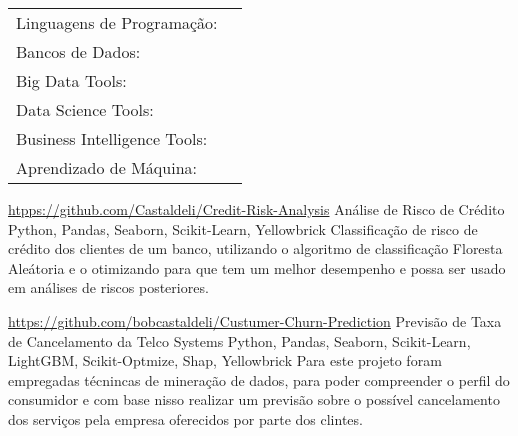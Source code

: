 \documentclass[11pt, letter]{awesome-cv}
\begin{document}
\begin{cventries}
	\vspace{-2mm}
	\cventry
	{}
	{\def\arraystretch{1.15}{\begin{tabular}{ l l }
				Linguagens de Programação:  & {\skill{ Python, R, SQL}} \\
				Bancos de Dados:  & {\skill{ MySQL, SQLServer, PostgreeSQL}} \\
				Big Data Tools:  & {\skill{ Apache Spark, Pyspark, Google BigQuery, Microsoft Azure Machine Learning}} \\
				Data Science Tools:  & {\skill{ Numpy, Pandas, Matplotlib, Seaborn, Scikit-Learn, XGBoost, LightGBM, Tidyverse, Caret}} \\
				Business Intelligence Tools:  & {\skill{ Microsoft Power BI, QlikView, Google Data Studio}} \\
				Aprendizado de Máquina:  & {\skill{ Mineração de Dados, Regressão, Classificação, Clusterização, Series Temporais}} \\
	\end{tabular}}}
	{}
	{}
	{}
\end{cventries}
\vspace{-14mm}
\vspace{-2mm}
\begin{cventries}
  \cventry
    {\url{htpps://github.com/Castaldeli/Credit-Risk-Analysis}}
    {Análise de Risco de Crédito\vspace{1mm}}
    {Python, Pandas, Seaborn, Scikit-Learn, Yellowbrick\vspace{-4mm}}
	{\vspace{1mm}}
	{Classificação de risco de crédito dos clientes de um banco, utilizando o algoritmo de classificação Floresta Aleátoria e o otimizando para que tem um melhor desempenho e possa ser usado em análises de riscos posteriores.}

  \cventry
    {\url{https://github.com/bobcastaldeli/Custumer-Churn-Prediction}}
	{Previsão de Taxa de Cancelamento da Telco Systems\vspace{1mm}}
	{Python, Pandas, Seaborn, Scikit-Learn, LightGBM, Scikit-Optmize,  Shap, Yellowbrick\vspace{-4mm}}
	{\vspace{1mm}}
	{Para este projeto foram empregadas técnincas de mineração de dados, para poder compreender o perfil do consumidor e com base nisso realizar um previsão sobre o possível cancelamento dos serviços pela empresa oferecidos por parte dos clintes.}
	
\end{cventries}
\end{document}
